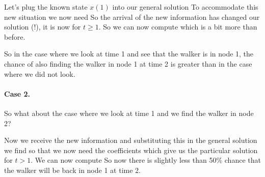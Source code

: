 Let's plug the known state $x(1)$ into our general solution 
To accommodate this new situation we now need 
So the arrival of the new information has changed our solution (!), it is now 
for $t\geq 1$. So we can now compute 
which is a bit more than before.

So in the case where we look at time 1 and see that the walker is in node 1, the chance of also finding the walker in node 1 at time 2 is greater than in the case where we did not look. 

\paragraph{Case 2.}So what about the case where we look at time 1 and we find the walker in node 2? 

Now we receive the new information 
and substituting this in the general solution we find 
so that we now need the coefficients 
which give us the particular solution
for $t>1$. We can now compute 
So now there is slightly less than 50\% chance that the walker will be back in node 1 at time 2. 

